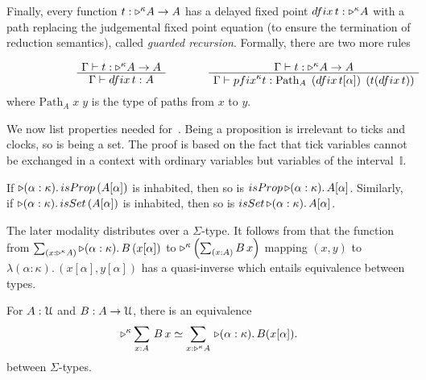 \documentclass[a4paper,UKenglish,numberwithinsect,cleveref,thm-restate]{lipics-v2021}
\numberwithin{equation}{section}
\theoremstyle{plain}
\begin{document}
  Finally, every function $t : \mathord{\triangleright}^\kappa A \to A$ has a delayed fixed point $\mathsf{dfix}\,t : \laterp^\kappa A$ with a path replacing the judgemental fixed point equation (to ensure the termination of reduction semantics), called \emph{guarded recursion}.
Formally, there are two more rules
\[
  \begin{minipage}{0.47\linewidth}
    \begin{prooftree}
      \AxiomC{$\Gamma \vdash t : \laterp^\kappa A \to A$}
      \UnaryInfC{$\Gamma \vdash \mathsf{dfix}\,t : A$}
    \end{prooftree}
  \end{minipage}
  \begin{minipage}{0.47\linewidth}
    \begin{prooftree}
      \AxiomC{$\Gamma \vdash t : \laterp^\kappa A \to A$}
      \UnaryInfC{$\Gamma \vdash \mathsf{pfix}^\kappa t : \mathrm{Path}_A\;\left(\mathsf{dfix}\,t[\alpha]\right)\;\left(t(\mathsf{dfix}\,t)\right)$}
    \end{prooftree}
  \end{minipage}
\]
where $\mathrm{Path}_A\;x\;y$ is the type of paths from $x$ to $y$.

We now list properties needed for~.
Being a proposition is irrelevant to ticks and clocks, so is being a set.
The proof is based on the fact that tick variables cannot be exchanged in a context with ordinary variables but  variables of the interval~$\mathbb{I}$.
\begin{lemma}
  If $\laterp (\alpha : \kappa).\, \mathsf{isProp}\,(A [\alpha])$ is inhabited, then so is $\mathsf{isProp}\,\laterp(\alpha: \kappa).\, A [\alpha]$. 
  Similarly, if $\laterp (\alpha : \kappa).\, \mathsf{isSet}\,(A [\alpha])$ is inhabited, then so is $\mathsf{isSet}\,\laterp(\alpha: \kappa).\, A [\alpha]$. 
\end{lemma}

The later modality distributes over a $\Sigma$-type.
It follows from that the function from $\sm{x : \laterp^\kappa A} \laterp (\alpha : \kappa).\, B\,(x[\alpha])$ to $\laterp^\kappa \left(\sm{x : A} B\,x\right)$ mapping $(x, y)$ to $\lambda (\alpha : \kappa).\, (x[\alpha], y[\alpha])$ has a quasi-inverse which entails equivalence between types.
\begin{lemma}\label{lem:later-sum}
  For $A : \mathcal{U}$ and $B : A \to \mathcal{U}$, there is an equivalence
  \begin{equation}\label{eq:later-sum}
    \eqv{\laterp^\kappa \sm{x : A} B\,x}{\sm{x : \laterp^\kappa A} \laterp (\alpha : \kappa).\, B (x [\alpha])}.
  \end{equation}
  between $\Sigma$-types.
\end{lemma}
\end{document}
